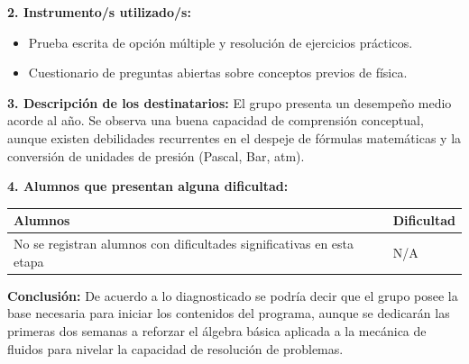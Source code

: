 \documentclass[11pt, a4paper]{article}
\begin{document}
\noindent \textbf{2. Instrumento/s utilizado/s:}
\begin{itemize}
\item Prueba escrita de opción múltiple y resolución de ejercicios prácticos.
\item Cuestionario de preguntas abiertas sobre conceptos previos de física.
\end{itemize}

\noindent \textbf{3. Descripción de los destinatarios:}
El grupo presenta un desempeño medio acorde al año. Se observa una buena capacidad de comprensión conceptual, aunque existen debilidades recurrentes en el despeje de fórmulas matemáticas y la conversión de unidades de presión (Pascal, Bar, atm).

\noindent \textbf{4. Alumnos que presentan alguna dificultad:}

\begin{tabular}{|p{}|p{}|}
\hline
\rowcolor{gray!20} \textbf{Alumnos} & \textbf{Dificultad} \\
\hline
No se registran alumnos con dificultades significativas en esta etapa & N/A \\
\hline
\end{tabular}

\vspace{2em}

\noindent \textbf{Conclusión:}
De acuerdo a lo diagnosticado se podría decir que el grupo posee la base necesaria para iniciar los contenidos del programa, aunque se dedicarán las primeras dos semanas a reforzar el álgebra básica aplicada a la mecánica de fluidos para nivelar la capacidad de resolución de problemas.
\end{document}
